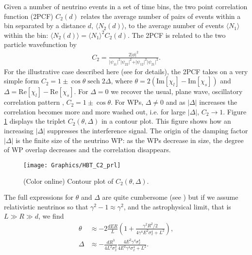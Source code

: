 \documentclass[aps,prl,reprint,floatfix
]{revtex4-1}
\DeclareMathOperator{\sech}{sech}
\newcommand\picWidthFacTwo{0.825}
\begin{document}
Given a number of neutrino events in a set of time bins, the two point correlation function (2PCF) $C_2(d)$ relates the average number of pairs of events within a bin separated by a distance $d$, $\langle N_2(d)\rangle$, to the average number of events $\langle N_1\rangle$ within the bin:  $\langle N_2(d)\rangle =\langle N_1\rangle^2C_2(d)$. The 2PCF is related to the two particle wavefunction by 
\begin{align}
	C_2=\frac{2\vert\phi\vert^2}{
        \vert\psi_{11}\vert^2\vert\psi_{22}\vert^2
        +\vert\psi_{12}\vert^2\vert\psi_{21}\vert^2
    }.\label{Eqn:C2}
\end{align} 
For the illustrative case described here (see \cite{SupplementalMaterial} for details), the 2PCF takes on a very simple form $C_2=1\pm\cos\theta\sech2\Delta$, where $\theta=2 (\text{Im}\left[\chi_l\right]-\text{Im}\left[\chi_s\right])$ and $\Delta=\text{Re}\left[\chi_l\right]-\text{Re}\left[\chi_s\right]$. For $\Delta=0$ we recover the usual, plane wave, oscillatory correlation pattern \cite{2006PhRvL..96l1802G}, $C_2=1\pm\cos\theta$. For WPs, $\Delta\neq 0$ and as $\vert\Delta\vert$ increases the correlation becomes more and more washed out, i.e. for large $\vert\Delta\vert$, $C_2 \rightarrow 1$. Figure \ref{fig:C2} displays the triplet $C_2\left(\theta,\Delta\right)$ in a contour plot. This figure shows how an increasing $\vert\Delta\vert$ suppresses the interference signal. The origin of the damping factor $\vert\Delta\vert$ is the finite size of the neutrino WP: as the WPs decrease in size, the degree of WP overlap decreases and the correlation disappears. 

\begin{figure}[ht]
	\texttt{[image: Graphics/HBT\_C2\_prl]}
	\caption{(Color online) Contour plot of $C_2\left(\theta,\Delta\right)$. }
	\label{fig:C2}
\end{figure}

The full expressions for $\theta$ and $\Delta$ are quite cumbersome (see \cite{SupplementalMaterial}) but if we assume relativistic neutrinos so that $\gamma^2-1\approx\gamma^2$, and the astrophysical limit, that is $L\gg R\gg d$, we find 
\begin{align}
	\theta&\approx-2\frac{d E R}{L} 
    \left(1+\frac{\gamma ^2 R^2/2}{4 \gamma ^4 E^2 \sigma_x^4+L^2}\right),\label{eqn:theta}\\
    \Delta&\approx-
    \frac{d R^3}{4 L^2 \sigma_x^2}
    \frac{4 E^2 \gamma ^4 \sigma_x^4}{ 4 E^2 \gamma ^4 \sigma_x^4+L^2}.\label{eqn:Delta}
\end{align}
\end{document}
